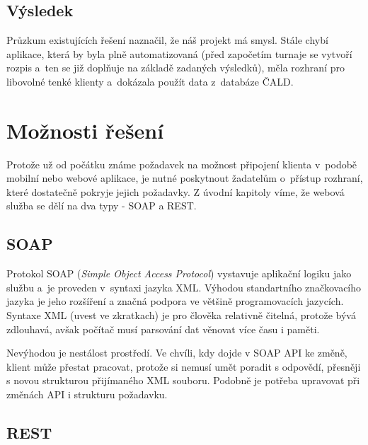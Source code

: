 \subsection{Výsledek}

\indent

Průzkum existujících řešení naznačil, že náš projekt má smysl. Stále chybí aplikace,
která by byla plně automatizovaná (před započetím turnaje se vytvoří rozpis a~ten se
již doplňuje na základě zadaných výsledků), měla rozhraní pro libovolné tenké klienty
a~dokázala použít data z~databáze ČALD.

\section{Možnosti řešení}

\indent

Protože už od počátku známe požadavek na možnost připojení klienta v~podobě mobilní nebo webové aplikace,
je nutné poskytnout žadatelům o~přístup rozhraní, které dostatečně pokryje jejich požadavky.
Z úvodní kapitoly víme, že webová služba se dělí na dva typy - SOAP a REST.

\subsection{SOAP}

\indent

Protokol SOAP (\textit{Simple Object Access Protocol}) vystavuje aplikační logiku jako službu
a~je proveden v~syntaxi jazyka XML. Výhodou standartního značkovacího jazyka je jeho rozšíření
a značná podpora ve většině programovacích jazycích. Syntaxe XML (uvest ve zkratkach) je pro člověka relativně čitelná,
protože bývá zdlouhavá, avšak počítač musí parsování dat věnovat více času i paměti.

\medskip

Nevýhodou je nestálost prostředí. Ve chvíli, kdy dojde v SOAP API ke změně, klient může přestat pracovat,
protože si nemusí umět poradit s odpovědí, přesněji s novou strukturou přijímaného XML souboru.
Podobně je potřeba upravovat při změnách API i strukturu požadavku.

 
\subsection{REST}


